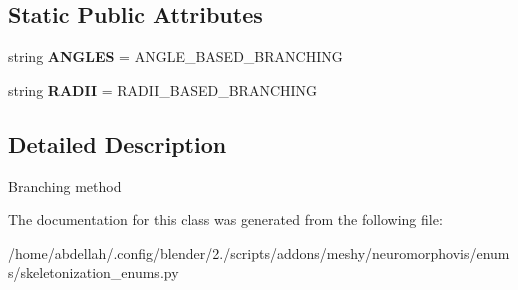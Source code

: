 \subsection*{Static Public Attributes}
\begin{DoxyCompactItemize}
\item 
string {\bfseries A\+N\+G\+L\+ES} = \textquotesingle{}A\+N\+G\+L\+E\+\_\+\+B\+A\+S\+E\+D\+\_\+\+B\+R\+A\+N\+C\+H\+I\+NG\textquotesingle{}\hypertarget{classmeshy_1_1neuromorphovis_1_1enums_1_1skeletonization__enums_1_1Skeletonization_1_1Branching_a1c657368e00a366d41cc1a4813902d9e}{}\label{classmeshy_1_1neuromorphovis_1_1enums_1_1skeletonization__enums_1_1Skeletonization_1_1Branching_a1c657368e00a366d41cc1a4813902d9e}

\item 
string {\bfseries R\+A\+D\+II} = \textquotesingle{}R\+A\+D\+I\+I\+\_\+\+B\+A\+S\+E\+D\+\_\+\+B\+R\+A\+N\+C\+H\+I\+NG\textquotesingle{}\hypertarget{classmeshy_1_1neuromorphovis_1_1enums_1_1skeletonization__enums_1_1Skeletonization_1_1Branching_ad7e77cc9d44ba9a14f7fa856a4f98637}{}\label{classmeshy_1_1neuromorphovis_1_1enums_1_1skeletonization__enums_1_1Skeletonization_1_1Branching_ad7e77cc9d44ba9a14f7fa856a4f98637}

\end{DoxyCompactItemize}


\subsection{Detailed Description}


\begin{DoxyVerb}Branching method
\end{DoxyVerb}
 

The documentation for this class was generated from the following file\+:\begin{DoxyCompactItemize}
\item 
/home/abdellah/.\+config/blender/2./scripts/addons/meshy/neuromorphovis/enums/skeletonization\+\_\+enums.\+py\end{DoxyCompactItemize}
